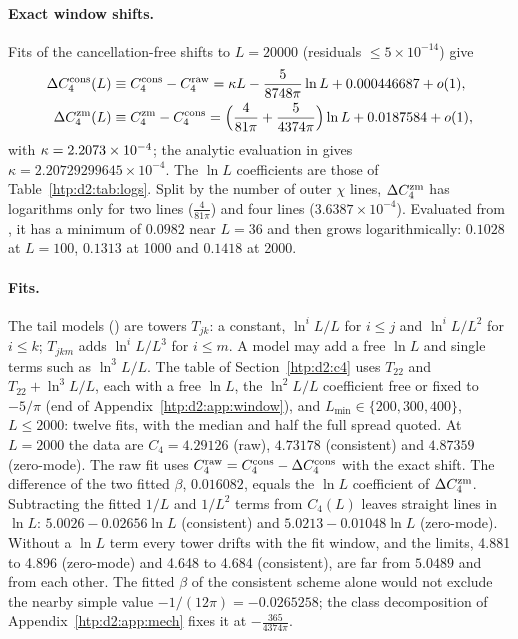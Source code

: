 \paragraph{Exact window shifts.} Fits of the cancellation-free shifts to $L=20000$ (residuals $\le5\times10^{-14}$) give
\begin{align}
 \Delta C_4^{\rm cons}(L)&\equiv C_4^{\rm cons}-C_4^{\rm raw}=\kappa L-\frac5{8748\pi}\ln L+0.000446687+o(1),\nonumber\\
 \Delta C_4^{\rm zm}(L)&\equiv C_4^{\rm zm}-C_4^{\rm cons}=\Big(\frac4{81\pi}+\frac5{4374\pi}\Big)\ln L+0.0187584+o(1),
 \label{htp:d2:eq:dC4shifts}
\end{align}
with $\kappa=2.2073\times10^{-4}$; the analytic evaluation in  gives
$\kappa=2.20729299645\times10^{-4}$. The $\ln L$ coefficients are those of Table~\ref{htp:d2:tab:logs}. Split by the number of
outer $\chi$ lines, $\Delta C_4^{\rm zm}$ has logarithms only for two lines ($\frac4{81\pi}$) and four lines
($3.6387\times10^{-4}$). Evaluated from , it has a minimum of $0.0982$ near $L=36$ and then grows logarithmically: $0.1028$ at $L=100$,
$0.1313$ at 1000 and $0.1418$ at 2000.

\paragraph{Fits.} The tail models () are towers $T_{jk}$: a constant, $\ln^iL/L$ for $i\le j$ and
$\ln^iL/L^2$ for $i\le k$; $T_{jkm}$ adds $\ln^iL/L^3$ for $i\le m$. A model may add a free $\ln L$ and single terms such
as $\ln^3L/L$. The table of Section~\ref{htp:d2:c4} uses $T_{22}$ and $T_{22}+\ln^3L/L$, each with a free $\ln L$, the $\ln^2L/L$
coefficient free or fixed to $-5/\pi$ (end of Appendix~\ref{htp:d2:app:window}), and $L_{\min}\in\{200,300,400\}$, $L\le2000$: twelve fits, with the median and half
the full spread quoted. At $L=2000$ the data are $C_4=4.29126$ (raw), $4.73178$ (consistent) and $4.87359$ (zero-mode). The
raw fit uses $C_4^{\rm raw}=C_4^{\rm cons}-\Delta C_4^{\rm cons}$ with the exact shift. The difference of the two fitted
$\beta$, $0.016082$, equals the $\ln L$ coefficient of $\Delta C_4^{\rm zm}$. Subtracting the fitted $1/L$ and $1/L^2$
terms from $C_4(L)$ leaves straight lines in $\ln L$: $5.0026-0.02656\ln L$ (consistent) and $5.0213-0.01048\ln L$
(zero-mode). Without a $\ln L$ term every tower drifts with
the fit window, and the limits, 4.881 to 4.896 (zero-mode) and 4.648 to 4.684 (consistent), are far from $5.0489$ and from
each other. The fitted $\beta$ of the consistent scheme alone would not exclude the nearby simple value $-1/(12\pi)=-0.0265258$; the class
decomposition of Appendix~\ref{htp:d2:app:mech} fixes it at $-\frac{365}{4374\pi}$.

